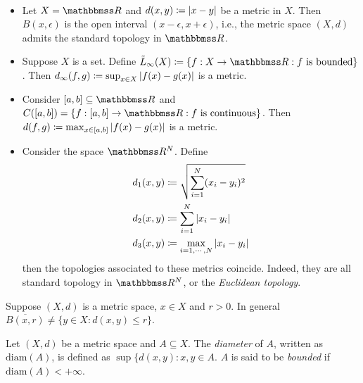 \documentclass[screen,single]{techreport}
\numberwithin{equation}{section}
\begin{document}
\begin{example}\label{Exa:MetricSpaces}\
	\begin{itemize}
		\item Let $X = \bbR$ and $d(x,y) \coloneqq |{x-y}|$ be a metric in $X$.
		Then $B(x,\epsilon)$ is the open interval $(x-\epsilon,x+\epsilon)$, i.e., the metric space $(X,d)$ admits the standard topology in $\bbR$.
		\item Suppose $X$ is a set.
		Define $\tilde{L}_\infty(X) \coloneqq \{ f :  X \to \bbR : f~\text{is bounded} \}$.
		Then $d_\infty(f,g) \coloneqq \sup_{x \in X} |{f(x) - g(x)}|$ is a metric.
		\item Consider $[a,b] \subseteq \bbR$ and $C([a,b]) = \{ f : [a,b] \to \bbR : f~\text{is continuous}\}$.
		Then $d(f,g) \coloneqq \max_{x \in [a,b]} |{f(x)-g(x)}|$ is a metric.
		\item Consider the space $\bbR^N$.
		Define
		\begin{align*}
			d_1(x,y) & \coloneqq \sqrt{\sum_{i=1}^N (x_i-y_i)^2} \\
			d_2(x,y) & \coloneqq \sum_{i=1}^N |{x_i - y_i}| \\
			d_3(x,y) & \coloneqq \max_{i=1,\cdots,N} |{x_i - y_i}|
		\end{align*}
		then the topologies associated to these metrics coincide.
		Indeed, they are all standard topology in $\bbR^N$, or the \emph{Euclidean topology}.
	\end{itemize}
\end{example}

\begin{remark}\label{Rem:ClosureOfBallsNotClosedBalls}
	Suppose $(X,d)$ is a metric space, $x \in X$ and $r > 0$.
	In general $\overline{B(x,r)} \neq \{y \in X : d(x,y) \le r \}$.
\end{remark}

\begin{definition}\label{De:Diameter}
	Let $(X,d)$ be a metric space and $A \subseteq X$.
	The \emph{diameter} of $A$, written as $\mathrm{diam}(A)$, is defined as $\sup \{ d(x,y) : x,y \in A$.
	$A$ is said to be \emph{bounded} if $\mathrm{diam}(A) < +\infty$.
\end{definition}
\end{document}
